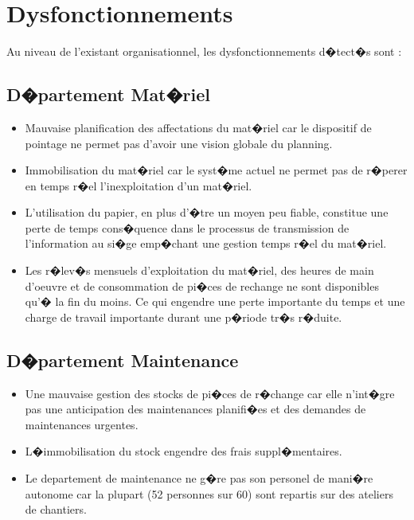 \documentclass{article}
\begin{document}
		
		
\section{Dysfonctionnements}	
		
		Au niveau de l'existant organisationnel, les dysfonctionnements d�tect�s sont :
		
		\subsection{D�partement Mat�riel}
				\begin{itemize}
						\item Mauvaise planification des affectations du mat�riel car le dispositif de pointage ne permet pas d'avoir une vision globale du planning.
						\item Immobilisation du mat�riel car le syst�me actuel ne permet pas de r�perer en temps r�el l'inexploitation d'un mat�riel.
						\item L'utilisation du papier, en plus d'�tre un moyen peu fiable, constitue une perte de temps cons�quence dans le processus de transmission de l'information au si�ge emp�chant une gestion temps r�el du mat�riel.
						\item Les r�lev�s mensuels d'exploitation du mat�riel, des heures de main d'oeuvre et de consommation de pi�ces de rechange ne sont disponibles qu'� la fin du moins. Ce qui engendre une perte importante du temps et une charge de travail importante durant une p�riode tr�s r�duite.
				\end{itemize}
		
		\subsection{D�partement Maintenance}
				\begin{itemize}
						\item Une mauvaise gestion des stocks de pi�ces de r�change car elle n'int�gre pas une anticipation des maintenances planifi�es et des demandes de maintenances urgentes.
						\item L�immobilisation du stock engendre des frais suppl�mentaires.
						\item Le departement de maintenance ne g�re pas son personel de mani�re autonome car la plupart (52 personnes sur 60) sont repartis sur des ateliers de chantiers.
				\end{itemize}
		
\end{document}
